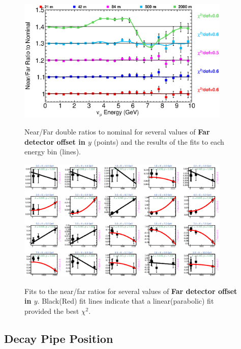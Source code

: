 \begin{figure}[ht]
  \begin{center}
    {\includegraphics[width=4.0in]{figures/LBNEFDY_nof_summary.eps}}
  \end{center}
\caption{ Near/Far double ratios to nominal for several values of {\bf Far detector offset in $y$} (points) and the results of the fits to each energy bin (lines).}
\end{figure}

\begin{figure}[hb]
  \begin{center}
    {\includegraphics[width=4.0in]{figures/LBNEFDY_nof_fits.eps}}
  \end{center}
\caption{ Fits to the near/far ratios for several values of {\bf Far detector offset in $y$}. Black(Red) fit lines indicate that a linear(parabolic) fit provided the best $\chi^2$. }
\end{figure}

\clearpage
\subsection{Decay Pipe Position}


